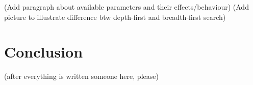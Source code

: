 \documentclass[10pt]{article}
\begin{document}
(Add paragraph about available parameters and their effects/behaviour)
(Add picture to illustrate difference btw depth-first and breadth-first search)
	
\section{Conclusion}

(after everything is written someone here, please)



\newpage
 

\end{document}
